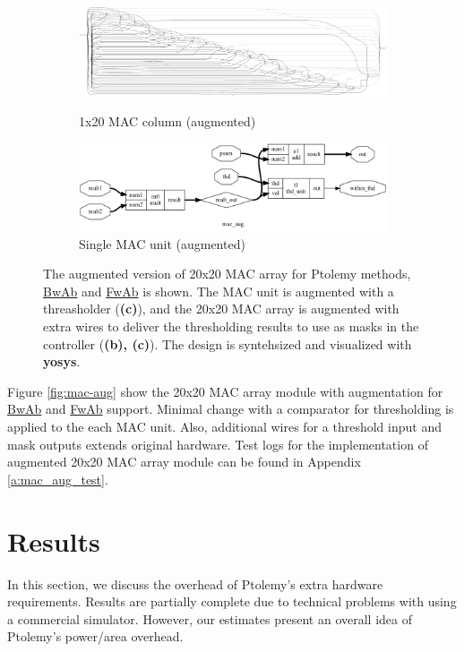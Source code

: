\documentclass[11pt]{article}
\begin{document}
\begin{figure}[H]
\begin{subfigure}{.45\textwidth}
      \begin{framed}
        \includegraphics[width=\linewidth]{images/mac_aug_col.dot.png}
        \caption{1x20 MAC column (augmented)}
      \end{framed}
      \begin{framed}
        \includegraphics[width=\linewidth]{images/mac_aug.dot.png}
        \caption{Single MAC unit (augmented)}
      \end{framed}
    \end{subfigure}
    \caption{The augmented version of 20x20 MAC array for Ptolemy methods, \underline{BwAb} and \underline{FwAb} is shown. The MAC unit is augmented with a threasholder (\textbf{(c)}), and the 20x20 MAC array is augmented with extra wires to deliver the thresholding results to use as masks in the controller (\textbf{(b), (c)}). The design is syntehsized and visualized with \textbf{yosys}.\label{fig:macs_aug}}
\end{figure}

Figure \ref{fig:mac-aug} show the 20x20 MAC array module with augmentation for \underline{BwAb} and \underline{FwAb} support. Minimal change with a comparator for thresholding is applied to the each MAC unit. Also, additional wires for a threshold input and mask outputs extends original hardware. Test logs for the implementation of augmented 20x20 MAC array module can be found in Appendix \ref{a:mac_aug_test}.

\section{Results}

In this section, we discuss the overhead of Ptolemy's extra hardware requirements. Results are partially complete due to technical problems with using a commercial simulator. However, our estimates present an overall idea of Ptolemy's power/area overhead.
\end{document}
